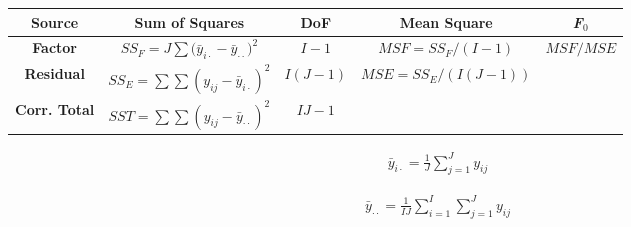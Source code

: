 \documentclass[12pt]{article}
\begin{document}
\pagestyle{empty}
\large
{}
\pagecolor{ehandbook}


\hspace{-1.75in}
\renewcommand*\arraystretch{1.5}
\begin{tabular}{|c|c|c|c|c|} \hline 
{\bf Source}        & {\bf Sum of Squares} & {\bf DoF} & {\bf Mean Square} & {\bf \it{F}$_0$} \\ \hline
{\bf Factor} & $SS_{F} = J\sum{{(\bar{y}_{i\cdot} - \bar{y}_{\cdot \cdot}})^2}$ & $I-1$ & $MSF = SS_F/(I-1)$ & $MSF / MSE$\\ \hline
{\bf Residual}     & $SS_{E} = \sum \sum{({y_{ij}} - \bar{y}_{i\cdot} )^2}$  & $I(J-1)$ & $MSE = SS_E/(I(J-1))$ & \\ \hline
{\bf Corr. Total} & $SST  = \sum \sum{{(y_{ij} - \bar{y}_{\cdot \cdot})^2}} $ & $IJ-1$ &  &\\ \hline
\end{tabular}

\vspace*{.5in}

\begin{eqnarray*}
\bar{y}_{i\cdot} =  \frac{1}{J} \sum_{j=1}^{J}{y_{ij}}
\end{eqnarray*}

\begin{eqnarray*}
\bar{y}_{\cdot \cdot} = \frac{1}{IJ} \sum_{i=1}^{I}{\sum_{j=1}^{J}{{y_{ij}}}}
\end{eqnarray*}
\end{document}
